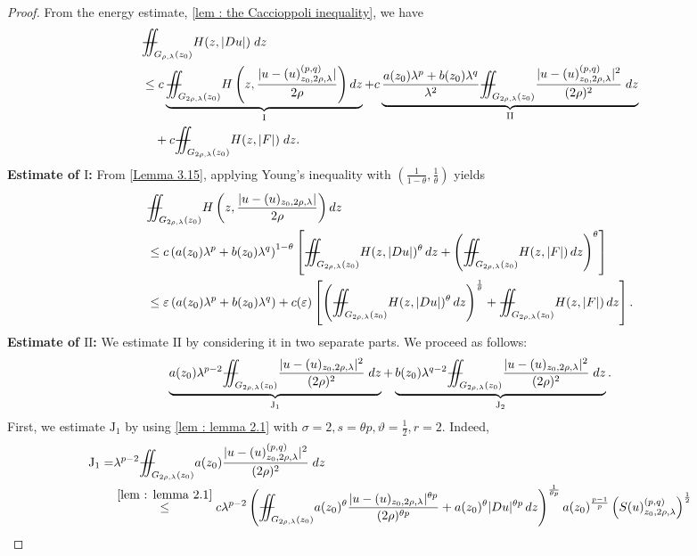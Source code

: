 \documentclass[11pt,oneside, english,reqno,twoside a4paper]{amsart}
\theoremstyle{definition}
\numberwithin{theorem}{section}
\numberwithin{equation}{section}
\newcommand{\iintss}{{\int\hspace{-0.28cm}\int}}
\newcommand{ \miints }{{\iintss\hspace{-0.56cm} -\hspace{-0.15cm}-}}
\newcommand{\miint}[1]{{\miints_{\hspace{-0.13cm}#1}}}
\begin{document}
\begin{proof}
    From the energy estimate, \cref{lem : the Caccioppoli inequality}, we have
\begin{align*}
&\miint{G_{\rho, \lambda}(z_0)}H(z,|Du|)\;dz\\
& \leq c \underbrace{\miint{G_{2\rho, \lambda}(z_0)}  H\left(z,\frac{|u-(u)^{(p,q)}_{z_0, 2\rho, \lambda}|}{2\rho}\right) dz}_{\mathrm{I}}+ c\underbrace{\frac{a(z_0)\lambda^p+b(z_0)\lambda^q}{\lambda^2}\miint{G_{2\rho, \lambda}(z_0)}\frac{|u-(u)^{(p,q)}_{z_0, 2\rho, \lambda}|^2}{(2\rho)^2}\;dz}_{\mathrm{II}}\\
&\quad +c\miint{G_{2\rho, \lambda}(z_0)} H(z,|F|) \;dz.
\end{align*}
\textbf{Estimate of $\mathrm{I}$:} From \cref{Lemma 3.15}, applying Young's inequality with $\left(\frac{1}{1-\theta}, \frac{1}{\theta}\right)$ yields
\begin{align*}
&\miint{G_{2\rho, \lambda}(z_0)}  H\left(z,\frac{|u-(u)_{z_0, 2\rho, \lambda}|}{2\rho}\right) dz\\
&\leq c\left(a(z_0)\lambda^p+b(z_0)\lambda^q\right)^{1-\theta}\left[\miint{G_{2 \rho,\lambda}\left(z_0\right)} H(z, |Du|)^{\theta}\, dz+\left(\miint{G_{2\rho, \lambda}(z_0)}H(z, |F|)\, dz\right)^{\theta}\right]\\
&\leq \varepsilon \left(a(z_0)\lambda^p+b(z_0)\lambda^q\right)+ c(\varepsilon) \left[\left(\miint{G_{2 \rho,\lambda}\left(z_0\right)} H(z, |Du|)^{\theta}\, dz\right)^{\frac{1}{\theta}}+\miint{G_{2\rho, \lambda}(z_0)}H(z, |F|)\, dz \right].
\end{align*}
\textbf{Estimate of $\mathrm{II}$:} We estimate $\mathrm{II}$ by considering it in two separate parts. We proceed as follows:
\begin{align*}
   \underbrace{ a(z_0)\lambda^{p-2}\miint{G_{2\rho, \lambda}(z_0)}\frac{|u-(u)_{z_0, 2\rho, \lambda}|^2}{(2\rho)^2}\;dz}_{\mathrm{J}_1} +\underbrace{b(z_0)\lambda^{q-2}\miint{G_{2\rho, \lambda}(z_0)}\frac{|u-(u)_{z_0, 2\rho, \lambda}|^2}{(2\rho)^2}\;dz}_{\mathrm{J}_2}.
\end{align*}
First, we estimate $\mathrm{J}_1$ by using \cref{lem : lemma 2.1} with $\sigma =2, s=\theta p, \vartheta=\frac{1}{2}, r=2.$ Indeed, 
\begin{align*}
 \mathrm{J}_1=&\lambda^{p-2}\miint{G_{2\rho, \lambda}(z_0)}a(z_0)\frac{|u-(u)^{(p,q)}_{z_0, 2\rho, \lambda}|^2}{(2\rho)^2}\;dz\\
 &\overset{\cref{lem : lemma 2.1}}{\leq} c \lambda^{p-2} \left(\miint{G_{2\rho, \lambda}(z_0)}a(z_0)^{\theta}\frac{|u-(u)_{z_0, 2\rho, \lambda}|^{\theta p}}{(2\rho)^{\theta p}}+a(z_0)^{\theta}|Du|^{\theta p}\,dz\right)^{\frac{1}{\theta p}}a(z_0)^{\frac{p-1}{p}}\left(S(u)^{(p,q)}_{z_0, 2\rho, \lambda}\right)^{\frac{1}{2}}\\

\end{align*}
\end{proof}
\end{document}
